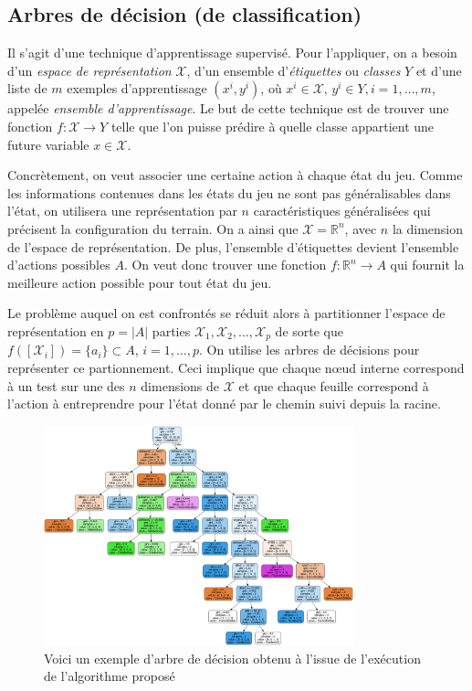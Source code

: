 \documentclass[12pt,a4paper]{article}
\begin{document}
\subsection*{Arbres de d\'ecision (de classification)}
Il s'agit d'une technique d'apprentissage supervis\'e. Pour l'appliquer, on 
a besoin d'un {\itshape espace de repr\'esentation} $\mathcal{X}$, d'un 
ensemble d'{\itshape \'etiquettes} ou {\itshape classes} $Y$ et d'une liste de 
$m$ exemples d'apprentissage $(x^i,y^i)$, o\`u $x^i \in \mathcal{X}$, $y^i \in 
Y, i = 1,\dotsc,m$, appel\'ee {\itshape ensemble d'apprentissage}.
Le but de cette technique est de trouver une fonction $f: \mathcal{X} \to 
Y$ telle que l'on puisse pr\'edire \`a quelle classe appartient une 
future variable $x \in \mathcal{X}$.

Concr\`etement, on veut associer une certaine action \`a chaque \'etat du jeu. 
Comme les informations contenues dans les \'etats du jeu ne sont pas 
g\'en\'eralisables dans l'\'etat, on utilisera une repr\'esentation par $n$ 
caract\'eristiques g\'en\'eralis\'ees qui pr\'ecisent la configuration du 
terrain. On a ainsi que $\mathcal{X} = \mathbb{R}^n$, avec $n$ la dimension de 
l'espace de repr\'esentation. De plus, l'ensemble d'\'etiquettes devient 
l'ensemble d'actions possibles $A$. On veut donc trouver une fonction $f: 
\mathbb{R}^n \to A$ qui fournit la meilleure action possible pour tout \'etat du 
jeu.

Le probl\`eme auquel on est confront\'es se r\'eduit alors \`a 
partitionner l'espace de repr\'esentation en $p=|A|$ parties 
$\mathcal{X}_1,\mathcal{X}_2,\dotsc,\mathcal{X}_p$ de sorte que 
$f([\mathcal{X}_i]) = \{ a_i \} \subset A$, $i = 1,\dotsc,p$. On utilise les 
arbres de d\'ecisions pour repr\'esenter ce partionnement. Ceci 
implique que chaque n\oe ud interne correspond \`a un test sur une des $n$ 
dimensions de $\mathcal{X}$ et que chaque feuille correspond \`a l'action \`a 
entreprendre pour l'\'etat donn\'e par le chemin suivi depuis la racine.

\begin{figure}[!h]
  \centering
  \captionsetup{justification=centering}
  \includegraphics[width=0.8\textwidth]{dt_example}
  \caption[Un exemple d'arbre de d\'ecision]{Voici un exemple d'arbre de 
d\'ecision obtenu \`a l'issue de l'ex\'ecution de l'algorithme propos\'e}
  \label{fig:dt_ex}
\end{figure}
\end{document}
